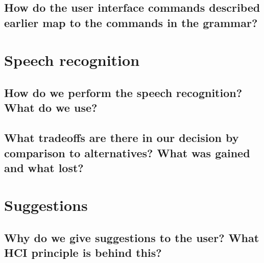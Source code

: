 \documentclass[]{article}
\begin{document}
\subsection{How do the user interface commands described earlier map to the commands in the grammar?  }

\section{Speech recognition}

\subsection{How do we perform the speech recognition? What do we use?}

\subsection{What tradeoffs are there in our decision by comparison to alternatives? What was gained and what lost?}

\clearpage

\section{Suggestions}

\subsection{Why do we give suggestions to the user? What HCI principle is behind this?}


\end{document}
